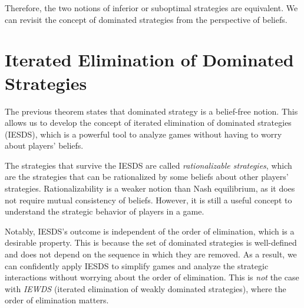 

Therefore, the two notions of inferior or suboptimal strategies are equivalent. We can revisit the concept of dominated strategies from the perspective of beliefs.



\section{Iterated Elimination of Dominated Strategies}

The previous theorem states that dominated strategy is a belief-free notion. This allows us to develop the concept of iterated elimination of dominated strategies (IESDS), which is a powerful tool to analyze games without having to worry about players' beliefs.

The strategies that survive the IESDS are called \textit{rationalizable strategies}, which are the strategies that can be rationalized by some beliefs about other players' strategies. Rationalizability is a weaker notion than Nash equilibrium, as it does not require mutual consistency of beliefs. However, it is still a useful concept to understand the strategic behavior of players in a game.

Notably, IESDS's outcome is independent of the order of elimination, which is a desirable property. This is because the set of dominated strategies is well-defined and does not depend on the sequence in which they are removed. As a result, we can confidently apply IESDS to simplify games and analyze the strategic interactions without worrying about the order of elimination. This is \textit{not} the case with \textit{IEWDS} (iterated elimination of weakly dominated strategies), where the order of elimination matters.



